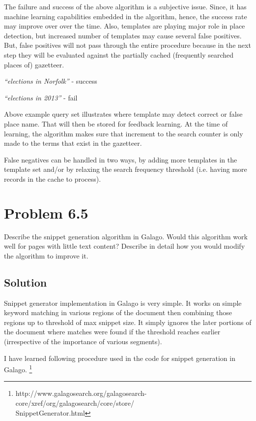 \documentclass[letterpaper,12pt]{article}
\begin{document}
The failure and success of the above algorithm is a subjective issue. Since, it has machine learning capabilities embedded in the algorithm, hence, the success rate may improve over over the time. Also, templates are playing major role in place detection, but increased number of templates may cause several false positives. But, false positives will not pass through the entire procedure because in the next step they will be evaluated against the partially cached (frequently searched places of) gazetteer.

\emph{``elections in Norfolk''} - success

\emph{``elections in 2013''} - fail

Above example query set illustrates where template may detect correct or false place name. That will then be stored for feedback learning. At the time of learning, the algorithm makes sure that increment to the search counter is only made to the terms that exist in the gazetteer.

False negatives can be handled in two ways, by adding more templates in the template set and/or by relaxing the search frequency threshold (i.e. having more records in the cache to process).


\pagebreak

\section{Problem 6.5}

Describe the snippet generation algorithm in Galago. Would this algorithm work well for pages with little text content? Describe in detail how you would modify the algorithm to improve it.

\subsection{Solution}

Snippet generator implementation in Galago is very simple. It works on simple keyword matching in various regions of the document then combining those regions up to threshold of max snippet size. It simply ignores the later portions of the document where matches were found if the threshold reaches earlier (irrespective of the importance of various segments).

I have learned following procedure used in the code for snippet generation in Galago. \footnote[1]{http://www.galagosearch.org/galagosearch-core/xref/org/galagosearch/core/store/\\SnippetGenerator.html}
\end{document}
